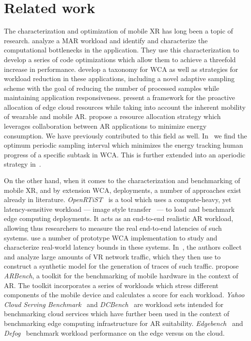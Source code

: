 \section{Related work}\label{sec:relwork}

The characterization and optimization of mobile \gls{XR} has long been a topic of research.
\textcite{srinivasan2009performance} analyze a \gls{MAR} workload and identify and characterize the computational bottlenecks in the application.
They use this characterization to develop a series of code optimizations which allow them to achieve a threefold increase in performance.
\textcite{wang2019towards} develop a taxonomy for \gls{WCA} as well as strategies for workload reduction in these applications, including a novel adaptive sampling scheme with the goal of reducing the number of processed samples while maintaining application responsiveness.
\textcite{huang2021proactive} present a framework for the proactive allocation of edge cloud resources while taking into account the inherent mobility of wearable and mobile \gls{AR}.
\textcite{al_shuwaili2017energy} propose a resource allocation strategy which leverages collaboration between \gls{AR} applications to minimize energy consumption.
We have previously contributed to this field as well.
In~\cite{moothedath2021energy,moothedath2022energy1} we find the optimum periodic sampling interval which minimizes the energy tracking human progress of a specific subtask in \gls{WCA}.
This is further extended into an aperiodic strategy in~\cite{moothedath2022energy2}.

On the other hand, when it comes to the characterization and benchmarking of mobile \gls{XR}, and by extension \gls{WCA}, deployments, a number of approaches exist already in literature.
\emph{OpenRTiST}~\cite{george2020openrtist} is a tool which uses a compute-heavy, yet latency-sensitive workload --- image style transfer~\cite{jing2019neural} --- to load and benchmark edge computing deployments.
It acts as an end-to-end realistic \gls{AR} workload, allowing thus researchers to measure the real end-to-end latencies of such systems.
\textcite{chen2017empirical} use a number of prototype \gls{WCA} implementation to study and characterize real-world latency bounds in these systems.
In~\cite{lecci2021open}, the authors collect and analyze large amounts of \gls{VR} network traffic, which they then use to construct a synthetic model for the generation of traces of such traffic.
\textcite{chetoui2022arbench} propose \emph{ARBench}, a toolkit for the benchmarking of mobile hardware in the context of \gls{AR}.
The toolkit incorporates a series of workloads which stress different components of the mobile device and calculates a score for each workload.
\emph{Yahoo Cloud Serving Benchmark}~\cite{cooper2010benchmarking} and \emph{DCBench}~\cite{jia2013characterizing} are workload sets intended for benchmarking cloud services which have further been used in the context of benchmarking edge computing infrastructure for \gls{AR} suitability.
\emph{Edgebench}~\cite{das2018edgebench} and \emph{Defog}~\cite{mcchesney2019defog} benchmark workload performance on the edge versus on the cloud.

